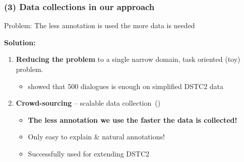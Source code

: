 \documentclass[10pt, compress,british,xcolor={svgnames,dvipsnames,x11names},trans]{beamer}
\begin{document}
\begin{frame}\frametitle{(3) Data collections in our approach}
    {\color{red}Problem: The less annotation is used the more data is needed}
    
    {\bf \color{darkgreen} Solution:}\\
    \begin{enumerate}
        \item {\bf Reducing the problem} to a single narrow domain, task oriented (toy) problem.
            \begin{itemize}
                \item \citet{wen_networkbased_2016} showed that 500 dialogues is enough on simplified DSTC2 data
            \end{itemize}
        \item {\bf Crowd-sourcing} -- scalable data collection~(\citet{platek2016wochat,wen_networkbased_2016})
            \begin{itemize}
                \item {\bf \color{darkgreen} The less annotation we use the faster the data is collected!}
                \item Only easy to explain \& natural annotations!
                \item Successfully used for extending DSTC2~\cite{wen_networkbased_2016}
            \end{itemize}
    \end{enumerate}
\end{frame}
\end{document}
